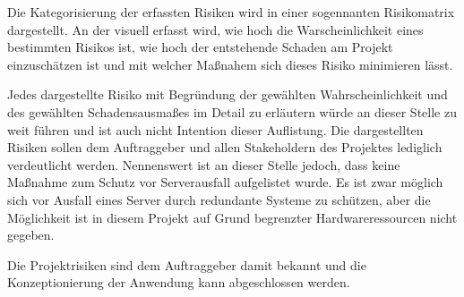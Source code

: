 Die Kategorisierung der erfassten Risiken wird in einer sogennanten Risikomatrix
dargestellt. An der visuell erfasst wird, wie hoch die Warscheinlichkeit eines
bestimmten Risikos ist, wie hoch der entstehende Schaden am Projekt
einzuschätzen ist und mit welcher Maßnahem sich dieses Risiko minimieren lässt.


Jedes dargestellte Risiko mit Begründung der gewählten Wahrscheinlichkeit und des gewählten
Schadensausmaßes im Detail zu erläutern würde an dieser Stelle zu weit führen
und ist auch nicht Intention dieser Auflistung. Die dargestellten Risiken
sollen dem Auftraggeber und allen Stakeholdern des Projektes lediglich verdeutlicht
werden. Nennenswert ist an dieser Stelle jedoch, dass keine Maßnahme zum Schutz vor
Serverausfall aufgelistet wurde. Es ist zwar möglich sich vor
Ausfall eines Server durch redundante Systeme zu schützen, aber die Möglichkeit
ist in diesem Projekt auf Grund begrenzter Hardwareressourcen nicht gegeben.

Die Projektrisiken sind dem Auftraggeber damit bekannt und die Konzeptionierung der
Anwendung kann abgeschlossen werden.